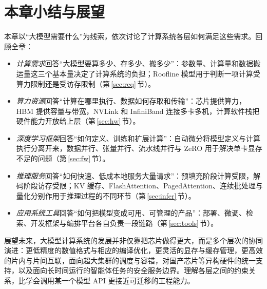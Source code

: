 \section{本章小结与展望}
\label{sec:summary}

本章以“大模型需要什么”为线索，依次讨论了计算系统各层如何满足这些需求。回顾全章：
\begin{itemize}
  \item \emph{计算需求}回答“大模型要算多少、存多少、搬多少”：参数量、计算量和数据搬运量这三个基本量决定了计算系统的负担；Roofline 模型用于判断一项计算受算力限制还是受访存限制（第\,\ref{sec:req}\,节）。
  \item \emph{算力资源}回答“计算在哪里执行、数据如何存取和传输”：芯片提供算力，HBM 提供容量与带宽，NVLink 和 InfiniBand 连接多卡多机，计算软件栈把硬件能力开放给上层（第\,\ref{sec:hw}\,节）。
  \item \emph{深度学习框架}回答“如何定义、训练和扩展计算”：自动微分将模型定义与计算执行分离开来，数据并行、张量并行、流水线并行与 ZeRO 用于解决单卡显存不足的问题（第\,\ref{sec:fw}\,节）。
  \item \emph{推理服务}回答“如何快速、低成本地服务大量请求”：预填充阶段计算受限，解码阶段访存受限；KV 缓存、FlashAttention、PagedAttention、连续批处理与量化分别作用于推理过程的不同环节（第\,\ref{sec:infer}\,节）。
  \item \emph{应用系统工具}回答“如何把模型变成可用、可管理的产品”：部署、微调、检索、开发框架与编排平台各自负责一段链路（第\,\ref{sec:tools}\,节）。
\end{itemize}

展望未来，大模型计算系统的发展并非仅靠把芯片做得更大，而是多个层次的协同演进：更低精度的数值格式与相应的编译优化，更灵活的显存与缓存管理，更高效的片内与片间互联，面向超大集群的调度与容错，对国产芯片等异构硬件的统一支持，以及面向长时间运行的智能体任务的安全服务边界。理解各层之间的约束关系，比学会调用某一个模型 API 更接近可迁移的工程能力。
